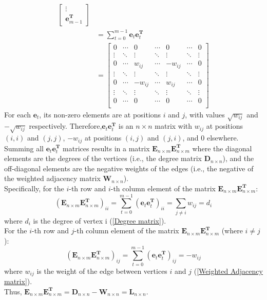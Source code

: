 \documentclass[oneside]{book}
\begin{document}
{{\begin{align}
\begin{bmatrix}
                    \vdots\\
                    \mathbf{e}_{m-1}^{\mathbf{T}}
                \end{bmatrix}\\
                &=\sum_{t=0}^{m-1}\mathbf{e}_{t}\mathbf{e}_{t}^{\mathbf{T}}\\
                &=
                \begin{bmatrix}
                    0      & \cdots & 0       & \cdots & 0       & \cdots & 0 \\
                    \vdots & \ddots & \vdots  & \ddots & \vdots  & \ddots & \vdots \\
                    0      & \cdots & w_{ij}  & \cdots & -w_{ij} & \cdots & 0 \\
                    \vdots & \ddots & \vdots  & \ddots & \vdots  & \ddots & \vdots \\
                    0      & \cdots & -w_{ij} & \cdots & w_{ij}  & \cdots & 0 \\
                    \vdots & \ddots & \vdots  & \ddots & \vdots  & \ddots & \vdots \\
                    0      & \cdots & 0       & \cdots & 0       & \cdots & 0 \\
                \end{bmatrix}
            \end{align}
        For each $\mathbf{e}_{t}$, its non-zero elements are at positions $i$ and $j$, with values $\sqrt{w_{ij}}$ and $-\sqrt{w_{ij}}$ respectively. Therefore,$\mathbf{e}_{t}\mathbf{e}_{t}^{\mathbf{T}}$ is an $n \times n$ matrix with $w_{ij}$ at positions $(i,i)$ and $(j,j)$, $-w_{ij}$ at positions $(i,j)$ and $(j,i)$, and 0 elsewhere.\\
        Summing all $\mathbf{e}_{t}\mathbf{e}_{t}^{\mathbf{T}}$ matrices results in a matrix $\mathbf{E}_{n \times m}\mathbf{E}_{n \times m}^{\mathbf{T}}$ where the diagonal elements are the degrees of the vertices (i.e., the degree matrix $\mathbf{D}_{n \times n}$), and the off-diagonal elements are the negative weights of the edges (i.e., the negative of the weighted adjacency matrix $\mathbf{W}_{n \times n}$).\\
        Specifically, for the $i$-th row and $i$-th column element of the matrix $\mathbf{E}_{n \times m}\mathbf{E}_{n \times m}^{\mathbf{T}}$:
        \[(\mathbf{E}_{n \times m}\mathbf{E}_{n \times m}^{\mathbf{T}})_{ii}=\sum_{t=0}^{m-1}(\mathbf{e}_{t}\mathbf{e}_{t}^{\mathbf{T}})_{ii}=\sum_{j \neq i}w_{ij}=d_{i}\]
        where $d_{i}$ is the degree of vertex i (\ref{Degree matrix}).\\
        For the $i$-th row and $j$-th column element of the matrix $\mathbf{E}_{n \times m}\mathbf{E}_{n \times m}^{\mathbf{T}}$ (where $i \neq j$):
        \[(\mathbf{E}_{n \times m}\mathbf{E}_{n \times m}^{\mathbf{T}})_{ij}=\sum_{t=0}^{m-1}(\mathbf{e}_{t}\mathbf{e}_{t}^{\mathbf{T}})_{ij}=-w_{ij}\]
        where $w_{ij}$ is the weight of the edge between vertices $i$ and $j$ (\ref{Weighted Adjacency matrix}).\\
        Thus, $\mathbf{E}_{n \times m}\mathbf{E}_{n \times m}^{\mathbf{T}}=\mathbf{D}_{n \times n}-\mathbf{W}_{n \times n}=\mathbf{L}_{n \times n}$.
    }
}
\end{document}
